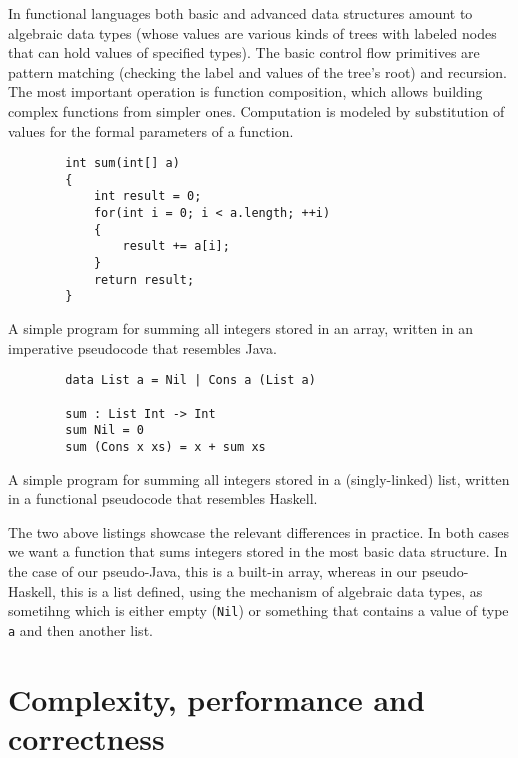 \documentclass[declaration,mgr,english,shortabstract]{iithesis}
\newcommand{\m}[1]{\texttt{#1}}
\begin{document}
In functional languages both basic and advanced data structures amount to algebraic data types (whose values are various kinds of trees with labeled nodes that can hold values of specified types). The basic control flow primitives are pattern matching (checking the label and values of the tree's root) and recursion. The most important operation is function composition, which allows building complex functions from simpler ones. Computation is modeled by substitution of values for the formal parameters of a function.

\begin{listing}[H]
    \begin{verbatim}
        int sum(int[] a)
        {
            int result = 0;
            for(int i = 0; i < a.length; ++i)
            {
                result += a[i];
            }
            return result;
        }
    \end{verbatim}
    \caption{A simple program for summing all integers stored in an array, written in an imperative pseudocode that resembles Java.}
\end{listing}

\begin{listing}[H]
    \begin{verbatim}
        data List a = Nil | Cons a (List a)

        sum : List Int -> Int
        sum Nil = 0
        sum (Cons x xs) = x + sum xs
    \end{verbatim}
    \begin{center}
        \caption{A simple program for summing all integers stored in a (singly-linked) list, written in a functional pseudocode that resembles Haskell.}
    \end{center}
\end{listing}

The two above listings showcase the relevant differences in practice. In both cases we want a function that sums integers stored in the most basic data structure. In the case of our pseudo-Java, this is a built-in array, whereas in our pseudo-Haskell, this is a list defined, using the mechanism of algebraic data types, as sometihng which is either empty (\m{Nil}) or something that contains a value of type \m{a} and then another list.


\section{Complexity, performance and correctness}
\end{document}
